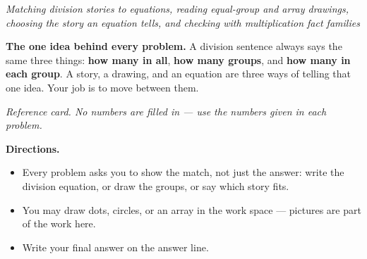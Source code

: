 \documentclass[12pt]{article}
\begin{document}

\begin{center}
\textit{Matching division stories to equations, reading equal-group and array
drawings, choosing the story an equation tells, and checking with
multiplication fact families}
\end{center}

\noindent\textbf{The one idea behind every problem.} A division sentence always
says the same three things: \textbf{how many in all}, \textbf{how many groups},
and \textbf{how many in each group}. A story, a drawing, and an equation are
three ways of telling that one idea. Your job is to move between them.

\begin{center}

\small\textit{Reference card. No numbers are filled in --- use the numbers given
in each problem.}\normalsize
\end{center}

\noindent\textbf{Directions.}
\begin{itemize}[leftmargin=1.2cm, itemsep=2pt, topsep=2pt]
\item Every problem asks you to show the match, not just the answer: write the
division equation, or draw the groups, or say which story fits.
\item You may draw dots, circles, or an array in the work space --- pictures are
part of the work here.
\item Write your final answer on the answer line.
\end{itemize}


\end{document}
